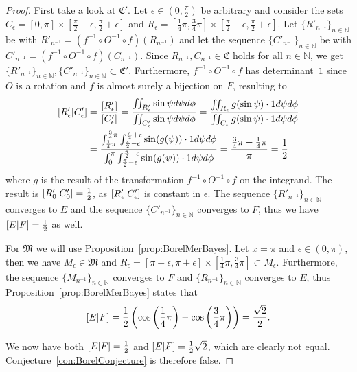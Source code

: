 \documentclass[a4paper]{report}
\theoremstyle{plain}
\theoremstyle{definition}
\theoremstyle{remark}
\numberwithin{equation}{chapter}
\newcommand{\N}{\mathbb{N}}
\let\P\relax
\DeclareMathOperator{\P}{\mathbb{P}}
\DeclareMathOperator{\1}{\mathbbm{1}}
\begin{document}
\begin{proof}
First take a look at $\mathfrak{C}'$. Let $\epsilon\in\left(0,\frac{\pi}{2}\right)$ be arbitrary and consider the sets $C_\epsilon=[0,\pi]\times\left[\frac{\pi}{2}-\epsilon,\frac{\pi}{2}+\epsilon\right]$ and $R_\epsilon=\left[\frac{1}{4}\pi,\frac{3}{4}\pi\right]\times\left[\frac{\pi}{2}-\epsilon,\frac{\pi}{2}+\epsilon\right]$. Let $\{R'_{n^{-1}}\}_{n\in\N}$ be with $R'_{n^{-1}}=(f^{-1}\circ O^{-1}\circ f)(R_{n^{-1}})$ and let the sequence $\{C'_{n^{-1}}\}_{n\in\N}$ be with $C'_{n^{-1}}=(f^{-1}\circ O^{-1}\circ f)(C_{n^{-1}})$. Since $R_{n^{-1}},C_{n^{-1}}\in\mathfrak{C}$ holds for all $n\in\N$, we get $\{R'_{n^{-1}}\}_{n\in\N},\{C'_{n^{-1}}\}_{n\in\N}\subset\mathfrak{C'}$. Furthermore, $f^{-1}\circ O^{-1}\circ f$ has determinant~$1$ since $O$ is a rotation and $f$ is almost surely a bijection on $F$, resulting to
\begin{align}
\P[R'_\epsilon|C'_\epsilon]&=\frac{\P[R'_\epsilon]}{\P[C'_\epsilon]}=\frac{\iint_{R'_\epsilon}\sin\psi d\psi d\phi}{\iint_{C'_\epsilon} \sin\psi d\psi d\phi}=\frac{\iint_{R_\epsilon}g(\sin\psi)\cdot1 d\psi d\phi}{\iint_{C_\epsilon}g(\sin\psi)\cdot1d\psi d\phi}\\
&=\frac{\int_{\frac{1}{4}\pi}^{\frac{3}{4}\pi}\int_{\frac{\pi}{2}-\epsilon}^{\frac{\pi}{2}+\epsilon}\sin (g(\psi))\cdot1 d\psi d\phi}{\int_{0}^{\pi}\int_{\frac{\pi}{2}-\epsilon}^{\frac{\pi}{2}+\epsilon}\sin (g(\psi))\cdot1d\psi d\phi}=\frac{\frac{3}{4}\pi-\frac{1}{4}\pi}{\pi}=\frac{1}{2}
\end{align}
where $g$ is the result of the transformation $f^{-1}\circ O^{-1}\circ f$ on the integrand. The result is $\P[R'_0|C'_0]=\frac{1}{2}$, as $\P[R'_\epsilon|C'_\epsilon]$ is constant in $\epsilon$. The sequence $\{R'_{n^{-1}}\}_{n\in\N}$ converges to $E$ and the sequence $\{C'_{n^{-1}}\}_{n\in\N}$ converges to $F$, thus we have $\P[E|F]=\frac{1}{2}$ as well.

For $\mathfrak{M}$ we will use Proposition~\ref{prop:BorelMerBayes}. Let $x=\pi$ and $\epsilon\in(0,\pi)$, then we have $M_\epsilon\in\mathfrak{M}$ and $R_\epsilon=[\pi-\epsilon,\pi+\epsilon]\times\left[\frac{1}{4}\pi,\frac{3}{4}\pi\right]\subset M_\epsilon$. Furthermore, the sequence $\{M_{n^{-1}}\}_{n\in\N}$ converges to $F$ and $\{R_{n^{-1}}\}_{n\in\N}$ converges to $E$, thus Proposition~\ref{prop:BorelMerBayes} states that
\begin{equation}
\P[E|F]=\frac{1}{2}\left(\cos\left(\frac{1}{4}\pi\right)-\cos\left(\frac{3}{4}\pi\right)\right)=\frac{\sqrt{2}}{2}.
\end{equation}

We now have both $\P[E|F]=\frac{1}{2}$ and $\P[E|F]=\frac{1}{2}\sqrt{2}$, which are clearly not equal. Conjecture~\ref{con:BorelConjecture} is therefore false.
\end{proof}
\end{document}
